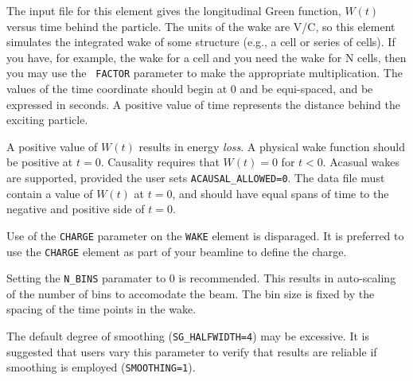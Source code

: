 The input file for this element gives the longitudinal Green function,
$W(t)$ versus time behind the particle. The units of the wake are V/C,
so this element simulates the integrated wake of some structure (e.g.,
a cell or series of cells).  If you have, for example, the wake for a
cell and you need the wake for N cells, then you may use the {\tt
FACTOR} parameter to make the appropriate multiplication.  The values
of the time coordinate should begin at 0 and be equi-spaced, and be expressed in seconds.
A positive value of time represents the distance behind the exciting
particle.  

A positive value of $W(t)$ results in energy {\em loss}.  A physical
wake function should be positive at $t=0$.
Causality requires that $W(t)=0$ for $t<0$. Acasual wakes are supported, 
provided the user sets \verb|ACAUSAL_ALLOWED=0|. The data file must contain
a value of $W(t)$ at $t=0$, and should have equal spans of time to the
negative and positive side of $t=0$.

Use of the {\tt CHARGE} parameter on the {\tt WAKE} element is
disparaged.  It is preferred to use the {\tt CHARGE} element as part
of your beamline to define the charge.  

Setting the {\tt N\_BINS} paramater to 0 is recommended.  This results
in auto-scaling of the number of bins to accomodate the beam.  The bin
size is fixed by the spacing of the time points in the wake.

The default degree of smoothing ({\tt SG\_HALFWIDTH=4}) may be excessive.
It is suggested that users vary this parameter to verify that results
are reliable if smoothing is employed ({\tt SMOOTHING=1}).

